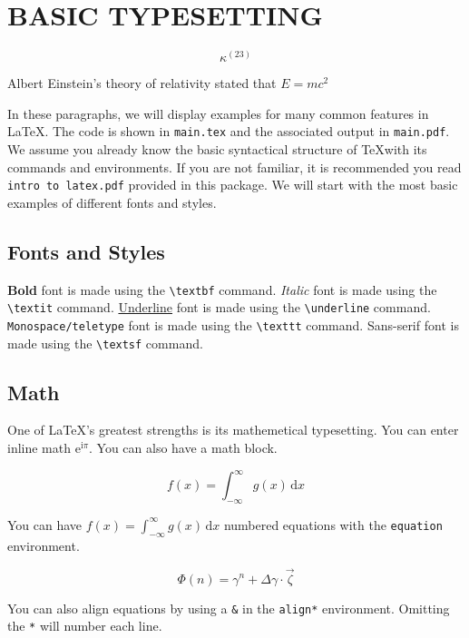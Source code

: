 \clearpage
\chapter{BASIC TYPESETTING}
\doublespacing


$$\kappa^(23)$$

Albert Einstein's theory of relativity stated that $E=mc^2$ \cite{Einstein:1944a} 


In these paragraphs, we will display examples for many common features in \LaTeX. The code is shown in \texttt{main.tex} and the associated output in \texttt{main.pdf}. We assume you already know the basic syntactical structure of \TeX with its commands and environments. If you are not familiar, it is recommended you read \texttt{intro to latex.pdf} provided in this package. We will start with the most basic examples of different fonts and styles.

\section*{Fonts and Styles}

\textbf{Bold} font is made using the \texttt{\textbackslash textbf} command. \textit{Italic} font is made using the \texttt{\textbackslash textit} command. \underline{Underline} font is made using the \texttt{\textbackslash underline} command. \texttt{Monospace/teletype} font is made using the \texttt{\textbackslash texttt} command. \textsf{Sans-serif} font is made using the \texttt{\textbackslash textsf} command.

\section*{Math}

One of \LaTeX's greatest strengths is its mathemetical typesetting. You can enter inline math $\mathrm{e}^{\mathrm{i}\pi}$. You can also have a math block.

$$
f(x) = \int _{-\infty} ^\infty g(x) \, \mathrm{d}x
$$



You can have $f(x) = \int _{-\infty} ^\infty g(x) \, \mathrm{d}x$ numbered equations with the \texttt{equation} environment.

\begin{equation}
	\Phi(n) = \gamma^n + \Delta \gamma \cdot \vec{\zeta} \label{eqn:exampleEqn}
\end{equation}

You can also align equations by using a \texttt{\&} in the \texttt{align*} environment. Omitting the \texttt{*} will number each line.

